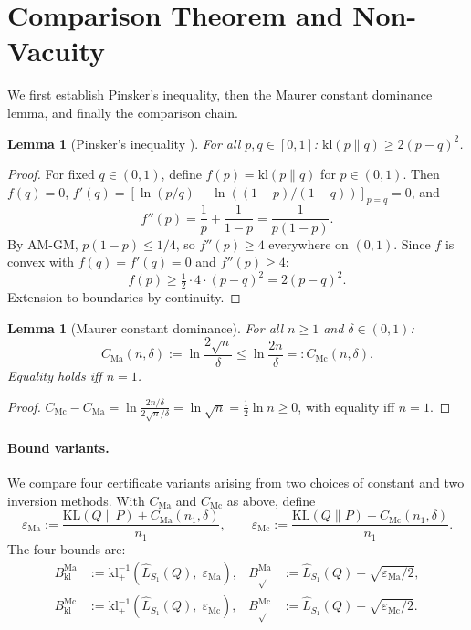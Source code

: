\documentclass[11pt,a4paper]{article}
\newtheorem{lemma}[theorem]{Lemma}
\newcommand{\kl}{\mathrm{kl}}
\newcommand{\KL}{\mathrm{KL}}
\newcommand{\klinv}{\kl^{-1}_+}
\begin{document}
\section{Comparison Theorem and Non-Vacuity}

We first establish Pinsker's inequality, then the Maurer constant dominance lemma, and finally the comparison chain.

\begin{lemma}[Pinsker's inequality {\cite{pinsker1964}}]
\label{lem:pinsker}
For all $p, q \in [0,1]$: $\kl(p\|q) \ge 2(p-q)^2$.
\end{lemma}

\begin{proof}
For fixed $q \in (0,1)$, define $f(p) = \kl(p\|q)$ for $p \in (0,1)$. Then $f(q) = 0$, $f'(q) = [\ln(p/q) - \ln((1-p)/(1-q))]_{p=q} = 0$, and
\[
f''(p) = \frac{1}{p} + \frac{1}{1-p} = \frac{1}{p(1-p)}.
\]
By AM-GM, $p(1-p) \le 1/4$, so $f''(p) \ge 4$ everywhere on $(0,1)$. Since $f$ is convex with $f(q) = f'(q) = 0$ and $f''(p) \ge 4$:
\[
f(p) \ge \tfrac{1}{2} \cdot 4 \cdot (p-q)^2 = 2(p-q)^2.
\]
Extension to boundaries by continuity.
\end{proof}

\begin{lemma}[Maurer constant dominance]
\label{lem:maurer}
For all $n \ge 1$ and $\delta \in (0,1)$:
\[
C_{\mathrm{Ma}}(n,\delta) := \ln\frac{2\sqrt{n}}{\delta} \le \ln\frac{2n}{\delta} =: C_{\mathrm{Mc}}(n,\delta).
\]
Equality holds iff $n = 1$.
\end{lemma}

\begin{proof}
$C_{\mathrm{Mc}} - C_{\mathrm{Ma}} = \ln\frac{2n/\delta}{2\sqrt{n}/\delta} = \ln\sqrt{n} = \tfrac{1}{2}\ln n \ge 0$, with equality iff $n = 1$.
\end{proof}

\paragraph{Bound variants.}
We compare four certificate variants arising from two choices of constant and two inversion methods. With $C_{\mathrm{Ma}}$ and $C_{\mathrm{Mc}}$ as above, define
\[
\varepsilon_{\mathrm{Ma}} := \frac{\KL(Q\|P) + C_{\mathrm{Ma}}(n_1,\delta)}{n_1}, \qquad \varepsilon_{\mathrm{Mc}} := \frac{\KL(Q\|P) + C_{\mathrm{Mc}}(n_1,\delta)}{n_1}.
\]
The four bounds are:
\begin{align*}
B_{\kl}^{\mathrm{Ma}} &:= \klinv(\hat{L}_{S_1}(Q),\; \varepsilon_{\mathrm{Ma}}), &
B_{\sqrt{}}^{\mathrm{Ma}} &:= \hat{L}_{S_1}(Q) + \sqrt{\varepsilon_{\mathrm{Ma}}/2}, \\
B_{\kl}^{\mathrm{Mc}} &:= \klinv(\hat{L}_{S_1}(Q),\; \varepsilon_{\mathrm{Mc}}), &
B_{\sqrt{}}^{\mathrm{Mc}} &:= \hat{L}_{S_1}(Q) + \sqrt{\varepsilon_{\mathrm{Mc}}/2}.
\end{align*}
\end{document}

